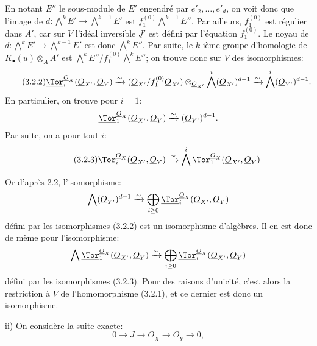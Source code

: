 
En
notant \(E''\) le sous-module de \(E'\) engendré par \(e'_2,\ldots,e'_d\), on voit donc que l'image de \(d:\bigwedge^kE'\longrightarrow\bigwedge^{k-1}E'\) est \(f_1^{(0)}\bigwedge^{k-1}E''\). Par ailleurs, \(f_1^{(0)}\) est régulier dans \(A'\), car sur \(V\) l'idéal inversible \(\underline{J}'\) est défini par l'équation \(f_1^{(0)}\). Le noyau de \(d:\bigwedge^kE'\longrightarrow\bigwedge^{k-1}E'\) est donc \(\bigwedge^kE''\). Par suite, le \(k\)-ième groupe d'homologie de \(K_\bullet(u)\otimes_AA'\) est \(\bigwedge^kE''/f_1^{(0)}\bigwedge^kE''\); on trouve donc sur \(V\) des isomorphismes:
\begin{equation}\tag{3.2.2}
\underline{\Tor}_i^{\underline{O}_X}(\underline{O}_{X'},\underline{O}_Y)
\xrightarrow{\sim}
(\underline{O}_{X'}/f_1^{(0)}\underline{O}_{X'})\otimes_{\underline{O}_{X'}}
\bigwedge^i(\underline{O}_{X'})^{d-1}
\xrightarrow{\sim}
\bigwedge^i(\underline{O}_{Y'})^{d-1}.
\end{equation}
En particulier, on trouve pour \(i=1\):
\[
\underline{\Tor}_1^{\underline{O}_X}(\underline{O}_{X'},\underline{O}_Y)
\xrightarrow{\sim}
(\underline{O}_{Y'})^{d-1}.
\]
Par suite, on a pour tout \(i\):
\begin{equation}\tag{3.2.3}
\underline{\Tor}_i^{\underline{O}_X}(\underline{O}_{X'},\underline{O}_Y)
\xrightarrow{\sim}
\bigwedge^i\underline{\Tor}_1^{\underline{O}_X}(\underline{O}_{X'},\underline{O}_Y)
\end{equation}

Or d'après 2.2, l'isomorphisme:
\[
\bigwedge(\underline{O}_{Y'})^{d-1}
\xrightarrow{\sim}
\bigoplus_{i\ge0}\underline{\Tor}_i^{\underline{O}_X}(\underline{O}_{X'},\underline{O}_Y)
\]
défini par les isomorphismes (3.2.2) est un isomorphisme d'algèbres. Il en est donc de même pour l'isomorphisme:
\[
\bigwedge\underline{\Tor}_1^{\underline{O}_X}(\underline{O}_{X'},\underline{O}_Y)
\xrightarrow{\sim}
\bigoplus_{i\ge0}\underline{\Tor}_i^{\underline{O}_X}(\underline{O}_{X'},\underline{O}_Y)
\]
défini par les isomorphismes (3.2.3). Pour des raisons d'unicité, c'est alors la restriction à \(V\) de l'homomorphisme (3.2.1), et ce dernier est donc un isomorphisme.

ii) On considère la suite exacte:
\[
0\longrightarrow \underline{J}\longrightarrow\underline{O}_X\longrightarrow\underline{O}_Y\longrightarrow0,
\]

